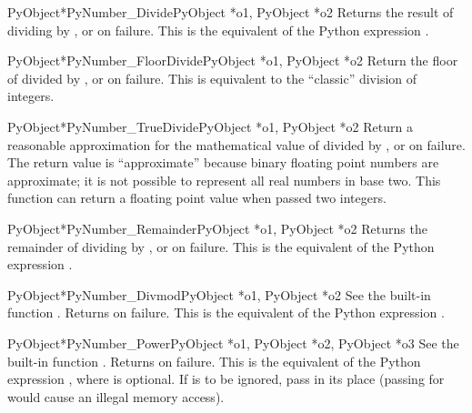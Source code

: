 \documentclass{manual}
\begin{document}
\begin{cfuncdesc}{PyObject*}{PyNumber_Divide}{PyObject *o1, PyObject *o2}
Returns the result of dividing  by , or \NULL{} on
failure. 
This is the equivalent of the Python expression .
\end{cfuncdesc}


\begin{cfuncdesc}{PyObject*}{PyNumber_FloorDivide}{PyObject *o1, PyObject *o2}
Return the floor of  divided by , or \NULL{} on
failure.  This is equivalent to the ``classic'' division of integers.
\end{cfuncdesc}


\begin{cfuncdesc}{PyObject*}{PyNumber_TrueDivide}{PyObject *o1, PyObject *o2}
Return a reasonable approximation for the mathematical value of
 divided by , or \NULL{} on failure.  The return value
is ``approximate'' because binary floating point numbers are
approximate; it is not possible to represent all real numbers in base
two.  This function can return a floating point value when passed two
integers.
\end{cfuncdesc}


\begin{cfuncdesc}{PyObject*}{PyNumber_Remainder}{PyObject *o1, PyObject *o2}
Returns the remainder of dividing  by , or \NULL{} on
failure.  This is the equivalent of the Python expression
.
\end{cfuncdesc}


\begin{cfuncdesc}{PyObject*}{PyNumber_Divmod}{PyObject *o1, PyObject *o2}
See the built-in function .
Returns \NULL{} on failure.  This is the equivalent of the Python
expression .
\end{cfuncdesc}


\begin{cfuncdesc}{PyObject*}{PyNumber_Power}{PyObject *o1,
                                             PyObject *o2, PyObject *o3}
See the built-in function .  Returns
\NULL{} on failure. This is the equivalent of the Python expression
, where  is optional.
If  is to be ignored, pass  in its place
(passing \NULL{} for  would cause an illegal memory access).
\end{cfuncdesc}
\end{document}
